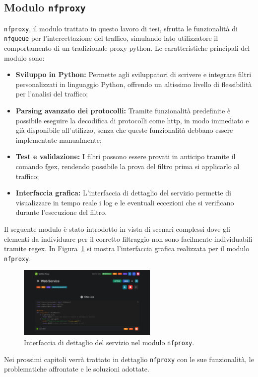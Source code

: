 \subsection{Modulo \texttt{nfproxy}}
\texttt{\gls{nfproxy}}, il modulo trattato in questo lavoro di tesi, sfrutta le funzionalità di \texttt{\gls{nfqueue}} per l'intercettazione del traffico, simulando lato utilizzatore il comportamento di un tradizionale proxy python. Le caratteristiche principali del modulo sono:
\begin{itemize}
    \setlength{\itemsep}{1pt}
    \setlength{\parskip}{1pt}
    \item \textbf{Sviluppo in Python:} Permette agli sviluppatori di scrivere e integrare filtri personalizzati in linguaggio Python, offrendo un altissimo livello di flessibilità per l'analisi del traffico;
    \item \textbf{Parsing avanzato dei protocolli:} Tramite funzionalità predefinite è possibile eseguire la decodifica di protocolli come \gls{http}, in modo immediato e già disponibile all'utilizzo, senza che queste funzionalità debbano essere implementate manualmente;
    \item \textbf{Test e validazione:} I filtri possono essere provati in anticipo tramite il comando fgex, rendendo possibile la prova del filtro prima si applicarlo al traffico;
    \item \textbf{Interfaccia grafica:} L'interfaccia di dettaglio del servizio permette di visualizzare in tempo reale i log e le eventuali eccezioni che si verificano durante l'esecuzione del filtro.
\end{itemize}

Il seguente modulo è stato introdotto in vista di scenari complessi dove gli elementi da individuare per il corretto filtraggio non sono facilmente individuabili tramite \gls{regex}. In Figura~\ref{fig:nfproxy_interface} si mostra l'interfaccia grafica realizzata per il modulo \texttt{nfproxy}.

\begin{figure}[H]
    \centering
    \includegraphics[width=0.6\textwidth]{images/chapter2/NFProxyInterface.png}
    \caption{Interfaccia di dettaglio del servizio nel modulo \texttt{nfproxy}.}\label{fig:nfproxy_interface}
\end{figure}

Nei prossimi capitoli verrà trattato in dettaglio \texttt{\gls{nfproxy}} con le sue funzionalità, le problematiche affrontate e le soluzioni adottate.
